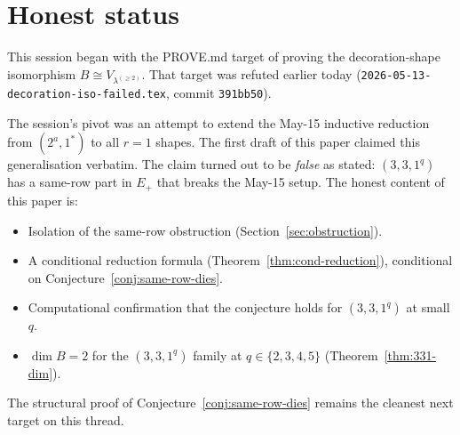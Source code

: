 \documentclass[11pt]{article}
\theoremstyle{definition}
\begin{document}
\section{Honest status}

This session began with the PROVE.md target of proving the
decoration-shape isomorphism $B \cong V_{\lambda^{(\ge 2)}}$. That
target was refuted earlier today
(\texttt{2026-05-13-decoration-iso-failed.tex}, commit \texttt{391bb50}).

The session's pivot was an attempt to extend the May-15 inductive
reduction from $(2^a, 1^*)$ to all $r = 1$ shapes. The first draft of
this paper claimed this generalisation verbatim. The claim turned out
to be \emph{false} as stated: $(3, 3, 1^q)$ has a same-row part in
$E_+$ that breaks the May-15 setup. The honest content of this paper
is:

\begin{itemize}[leftmargin=2em,topsep=0.2em,itemsep=0.1em]
\item Isolation of the same-row obstruction
(Section~\ref{sec:obstruction}).
\item A conditional reduction formula
(Theorem~\ref{thm:cond-reduction}), conditional on
Conjecture~\ref{conj:same-row-dies}.
\item Computational confirmation that the conjecture holds for
$(3, 3, 1^q)$ at small $q$.
\item $\dim B = 2$ for the $(3, 3, 1^q)$ family at $q \in \{2, 3, 4, 5\}$
(Theorem~\ref{thm:331-dim}).
\end{itemize}

The structural proof of Conjecture~\ref{conj:same-row-dies} remains
the cleanest next target on this thread.
\end{document}
